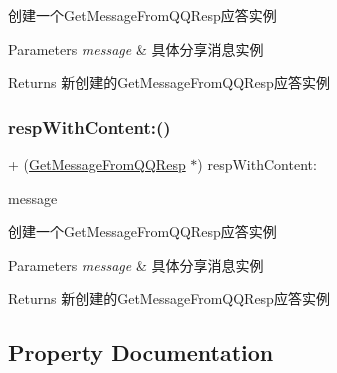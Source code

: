 创建一个\+Get\+Message\+From\+Q\+Q\+Resp应答实例 
\begin{DoxyParams}{Parameters}
{\em message} & 具体分享消息实例 \\
\hline
\end{DoxyParams}
\begin{DoxyReturn}{Returns}
新创建的\+Get\+Message\+From\+Q\+Q\+Resp应答实例 
\end{DoxyReturn}
\mbox{\label{interface_get_message_from_q_q_resp_aa51d07fba500424745a3ba7de4e334cc}} 
\subsubsection{\texorpdfstring{resp\+With\+Content\+:()}{respWithContent:()}\hspace{0.1cm}{\footnotesize\ttfamily [2/2]}}
{\footnotesize\ttfamily + (\mbox{\hyperlink{interface_get_message_from_q_q_resp}{Get\+Message\+From\+Q\+Q\+Resp}} $\ast$) resp\+With\+Content\+: \begin{DoxyParamCaption}\item[{(\mbox{\hyperlink{interface_q_q_api_object}{Q\+Q\+Api\+Object}} $\ast$)}]{message }\end{DoxyParamCaption}}

创建一个\+Get\+Message\+From\+Q\+Q\+Resp应答实例 
\begin{DoxyParams}{Parameters}
{\em message} & 具体分享消息实例 \\
\hline
\end{DoxyParams}
\begin{DoxyReturn}{Returns}
新创建的\+Get\+Message\+From\+Q\+Q\+Resp应答实例 
\end{DoxyReturn}


\subsection{Property Documentation}
\mbox{\label{interface_get_message_from_q_q_resp_af0946d12cd159b3e7a8fc8c459f1e01f}} 
